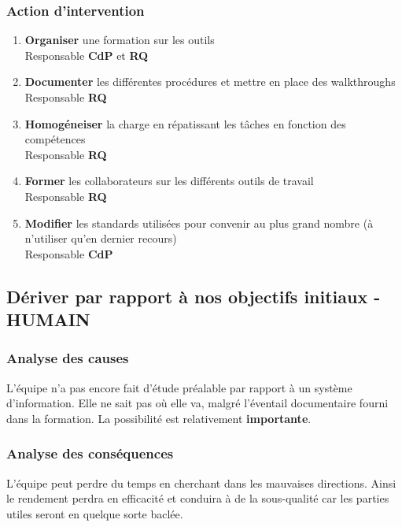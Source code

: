 \subsubsection{Action d'intervention}

\begin{enumerate}
\item {\bf Organiser} une formation sur les outils \\ Responsable {\bf CdP} et {\bf RQ}
\item {\bf Documenter} les différentes procédures et mettre en place des walkthroughs \\ Responsable {\bf RQ}
\item {\bf Homogéneiser} la charge en répatissant les tâches en fonction des compétences \\ Responsable {\bf RQ}
\item {\bf Former} les collaborateurs sur les différents outils de travail \\ Responsable {\bf RQ}
\item {\bf Modifier} les standards utilisées pour convenir au plus grand nombre (à n'utiliser qu'en dernier recours) \\ Responsable {\bf CdP}
\end{enumerate}

\subsection{Dériver par rapport à nos objectifs initiaux - HUMAIN}
\subsubsection{Analyse des causes}

L'équipe n'a pas encore fait d'étude préalable par rapport à un système d'information. Elle ne sait pas où elle va, malgré l'éventail documentaire fourni dans la formation. 
La possibilité est relativement {\bf importante}.

\subsubsection{Analyse des conséquences}

L'équipe peut perdre du temps en cherchant dans les mauvaises directions. Ainsi le rendement perdra en efficacité et conduira à de la sous-qualité car les parties utiles seront en quelque sorte baclée. 

